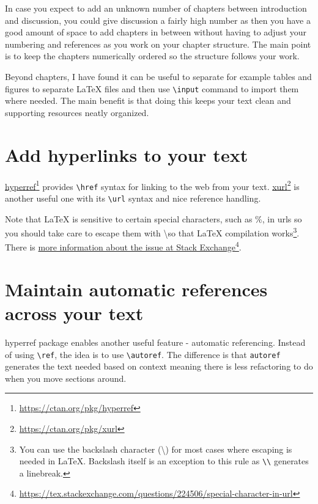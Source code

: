In case you expect to add an unknown number of chapters between introduction and discussion, you could give discussion a fairly high number as then you have a good amount of space to add chapters in between without having to adjust your numbering and references as you work on your chapter structure. The main point is to keep the chapters numerically ordered so the structure follows your work.

Beyond chapters, I have found it can be useful to separate for example tables and figures to separate LaTeX files and then use \texttt{\textbackslash input} command to import them where needed.
The main benefit is that doing this keeps your text clean and supporting resources neatly organized.

\section{Add hyperlinks to your text}

\href{https://ctan.org/pkg/hyperref}{hyperref}\footnote{\url{https://ctan.org/pkg/hyperref}} provides \texttt{\textbackslash href} syntax for linking to the web from your text. \href{https://ctan.org/pkg/xurl}{xurl}\footnote{\url{https://ctan.org/pkg/xurl}} is another useful one with its \texttt{\textbackslash url} syntax and nice reference handling.

Note that LaTeX is sensitive to certain special characters, such as \%, in urls so you should take care to escape them with \textbackslash so that LaTeX compilation works\footnote{You can use the backslash character (\textbackslash) for most cases where escaping is needed in LaTeX. Backslash itself is an exception to this rule as \texttt{\textbackslash\textbackslash} generates a linebreak.}.
There is \href{https://tex.stackexchange.com/questions/224506/special-character-in-url}{more information about the issue at Stack Exchange}\footnote{\url{https://tex.stackexchange.com/questions/224506/special-character-in-url}}.

\section{Maintain automatic references across your text}

hyperref package enables another useful feature - automatic referencing. Instead of using \texttt{\textbackslash ref}, the idea is to use \texttt{\textbackslash autoref}.
The difference is that \texttt{autoref} generates the text needed based on context meaning there is less refactoring to do when you move sections around.

